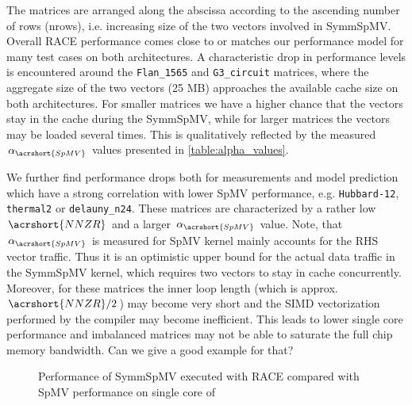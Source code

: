 The matrices are arranged along the abscissa according to the ascending number of rows (\acrshort{nrows}), i.e. increasing size of the two vectors involved in \acrshort{SymmSpMV}. Overall \acrshort{RACE}  performance comes close to or matches our performance model for many test cases on both architectures. 
A characteristic drop in performance levels is encountered around the \texttt{Flan\_1565} and \texttt{G3\_circuit} matrices, where the aggregate size of the two vectors (25 MB) approaches the available cache size on both architectures. For smaller matrices we have a higher chance that the vectors stay in the cache during the \acrshort{SymmSpMV}, while for larger matrices the vectors may be loaded several times. This is qualitatively reflected by the measured $\alpha_{\acrshort{SpMV}}$ values presented in \cref{table:alpha_values}. 

We further find performance drops both for measurements and model prediction which have a strong correlation with lower \acrshort{SpMV} performance, e.g. \texttt{Hubbard-12}, \texttt{thermal2} or \texttt{delauny\_n24}. These matrices are characterized by a rather low $\acrshort{NNZR}$ and a larger $\alpha_{\acrshort{SpMV}}$ value. Note, that  $\alpha_{\acrshort{SpMV}}$ is measured for \acrshort{SpMV}  kernel mainly accounts for the RHS vector traffic. Thus it is an optimistic upper bound for the actual data traffic in the \acrshort{SymmSpMV} kernel, which requires two vectors to stay in cache concurrently. Moreover, for these matrices the inner loop length (which is approx. $\acrshort{NNZR}/2$) may become very short and the SIMD vectorization performed by the compiler may become inefficient. This leads to lower single core performance and imbalanced matrices may not be able to saturate the full chip memory bandwidth. {\GW Can we give a good example for that?}  

 \begin{figure}[thbp]
 	\centering
 	\caption{Performance of \acrshort{SymmSpMV} executed with \acrshort{RACE} compared with \acrshort{SpMV} performance on single core of \SKX}
 	\label{fig:SpMV_vs_SymmSpMV_single_core}
 \end{figure}
 
